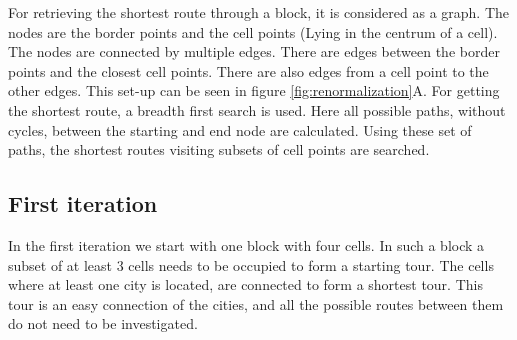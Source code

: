 For retrieving the shortest route through a block, it is considered as a graph. The nodes are the border points and the cell points (Lying in the centrum of a cell). The nodes are connected by multiple edges. There are edges between the border points and the closest cell points. There are also edges from a cell point to the other edges. This set-up can be seen in figure \ref{fig:renormalization}A. For getting the shortest route, a breadth first search is used. Here all possible paths, without cycles, between the starting and end node are calculated. Using these set of paths, the shortest routes visiting subsets of cell points are searched.

\subsection{First iteration}
In the first iteration we start with one block with four cells. In such a block a subset of at least 3 cells needs to be occupied to form a starting tour. The cells where at least one city is located, are connected to form a shortest tour. This tour is an easy connection of the cities, and all the possible routes between them do not need to be investigated.

